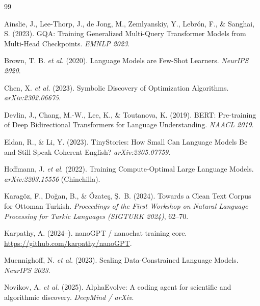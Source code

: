 \documentclass[11pt,a4paper]{article}
\begin{document}

\begin{thebibliography}{99}

Ainslie, J., Lee-Thorp, J., de Jong, M., Zemlyanskiy, Y., Lebrón, F.,
\& Sanghai, S. (2023).
\newblock GQA: Training Generalized Multi-Query Transformer Models from Multi-Head Checkpoints.
\newblock \emph{EMNLP 2023}.

Brown, T. B. \emph{et al.} (2020).
\newblock Language Models are Few-Shot Learners.
\newblock \emph{NeurIPS 2020}.

Chen, X. \emph{et al.} (2023).
\newblock Symbolic Discovery of Optimization Algorithms.
\newblock \emph{arXiv:2302.06675}.

Devlin, J., Chang, M.-W., Lee, K., \& Toutanova, K. (2019).
\newblock BERT: Pre-training of Deep Bidirectional Transformers for Language Understanding.
\newblock \emph{NAACL 2019}.

Eldan, R., \& Li, Y. (2023).
\newblock TinyStories: How Small Can Language Models Be and Still Speak Coherent English?
\newblock \emph{arXiv:2305.07759}.

Hoffmann, J. \emph{et al.} (2022).
\newblock Training Compute-Optimal Large Language Models.
\newblock \emph{arXiv:2203.15556} (Chinchilla).

Karagöz, F., Doğan, B., \& Özateş, Ş.~B. (2024).
\newblock Towards a Clean Text Corpus for Ottoman Turkish.
\newblock \emph{Proceedings of the First Workshop on Natural Language Processing for Turkic Languages (SIGTURK 2024)}, 62--70.

Karpathy, A. (2024--).
\newblock nanoGPT / nanochat training core.
\newblock \url{https://github.com/karpathy/nanoGPT}.

Muennighoff, N. \emph{et al.} (2023).
\newblock Scaling Data-Constrained Language Models.
\newblock \emph{NeurIPS 2023}.

Novikov, A. \emph{et al.} (2025).
\newblock AlphaEvolve: A coding agent for scientific and algorithmic discovery.
\newblock \emph{DeepMind / arXiv}.


\end{thebibliography}
\end{document}
